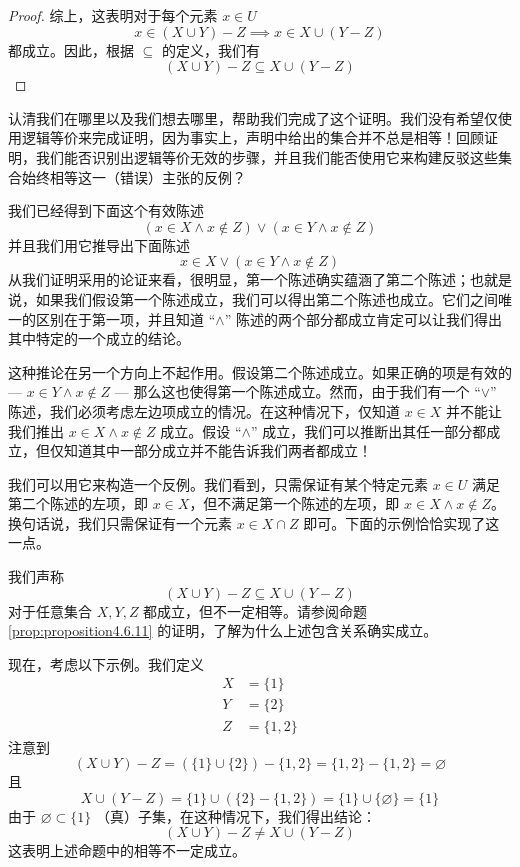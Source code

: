 \begin{proof}
    综上，这表明对于每个元素 $x \in U$ 
    \[x \in (X \cup Y ) - Z \implies x \in X \cup (Y - Z)\]
    都成立。因此，根据 $\subseteq$ 的定义，我们有
    \[(X \cup Y ) - Z \subseteq X \cup (Y - Z)\]
\end{proof}

认清我们在哪里以及我们想去哪里，帮助我们完成了这个证明。我们没有希望仅使用逻辑等价来完成证明，因为事实上，声明中给出的集合并不总是相等！回顾证明，我们能否识别出逻辑等价无效的步骤，并且我们能否使用它来构建反驳这些集合始终相等这一（错误）主张的反例？

我们已经得到下面这个有效陈述
\[(x \in X \land x \notin Z) \lor (x \in Y \land x \notin Z)\]
并且我们用它推导出下面陈述
\[x \in X \lor (x \in Y \land x \notin Z)\]
从我们证明采用的论证来看，很明显，第一个陈述确实蕴涵了第二个陈述；也就是说，如果我们假设第一个陈述成立，我们可以得出第二个陈述也成立。它们之间唯一的区别在于第一项，并且知道 ``$\land$'' 陈述的两个部分都成立肯定可以让我们得出其中特定的一个成立的结论。

这种推论在另一个方向上不起作用。假设第二个陈述成立。如果正确的项是有效的 --- $x \in Y \land x \notin Z$ --- 那么这也使得第一个陈述成立。然而，由于我们有一个 ``$\lor$'' 陈述，我们必须考虑左边项成立的情况。在这种情况下，仅知道 $x \in X$ 并不能让我们推出 $x \in X \land x \notin Z$ 成立。假设 ``$\land$'' 成立，我们可以推断出其任一部分都成立，但仅知道其中一部分成立并不能告诉我们两者都成立！

我们可以用它来构造一个反例。我们看到，只需保证有某个特定元素 $x \in U$ 满足第二个陈述的左项，即 $x \in X$，但不满足第一个陈述的左项，即 $x \in X \land x \notin Z$。换句话说，我们只需保证有一个元素 $x \in X \cap Z$ 即可。下面的示例恰恰实现了这一点。

\begin{example}
    我们声称
    \[(X \cup Y ) - Z \subseteq X \cup (Y - Z)\]
    对于任意集合 $X,Y,Z$ 都成立，但不一定相等。请参阅命题 \ref{prop:proposition4.6.11} 的证明，了解为什么上述包含关系确实成立。
\end{example}

现在，考虑以下示例。我们定义
\begin{align*}
    X &= \{1\} \\
    Y &= \{2\} \\
    Z &= \{1, 2\}
\end{align*}
注意到
\[(X \cup Y ) - Z = (\{1\} \cup \{2\}) - \{1, 2\} = \{1, 2\} - \{1, 2\} = \varnothing\]
且
\[X \cup (Y - Z) = \{1\} \cup (\{2\} - \{1, 2\}) = \{1\} \cup \{\varnothing\} = \{1\}\]
由于 $\varnothing \subset \{1\}$ （真）子集，在这种情况下，我们得出结论：
\[(X \cup Y ) - Z \ne X \cup (Y - Z)\]
这表明上述命题中的相等不一定成立。

